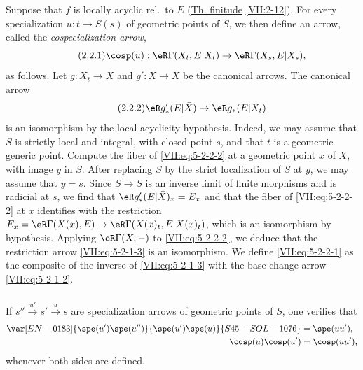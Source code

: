 Suppose that $f$ is locally acyclic rel.\ to $E$ (\hyperref[VII]{Th. finitude} \ref{VII:2-12}). For
every specialization $u:t\to S(s)$ of geometric points of $S$, we then define
an arrow, called the \emph{cospecialization arrow},
\begin{equation*}\tag{2.2.1}\label{VII:eq:5-2-2-1}
  \cosp(u):\eR\Gamma(X_t,E|X_t) \to \eR\Gamma(X_s,E|X_s) \text{,} 
\end{equation*}
as follows. Let $g:X_t\to X$ and $g':\bar X\to X$ be the canonical arrows.
The canonical arrow
\begin{equation*}\tag{2.2.2}\label{VII:eq:5-2-2-2}
  \eR g'_\ast(E|\bar X)\to \eR g_\ast(E|X_t) 
\end{equation*}
is an isomorphism by the local-acyclicity hypothesis. Indeed, we may assume
that $S$ is strictly local and integral, with closed point $s$, and that $t$
is a geometric generic point. Compute the fiber of
\eqref{VII:eq:5-2-2-2} at a geometric point $x$ of $X$, with image $y$ in
$S$. After replacing $S$ by the strict localization of $S$ at $y$, we may
assume that $y=s$. Since $\bar S\to S$ is an inverse limit of finite
morphisms and is radicial at $s$, we find that
$\eR g'_\ast(E|\bar X)_x = E_x$ and that the fiber of
\eqref{VII:eq:5-2-2-2} at $x$ identifies with the restriction
$E_x=\eR\Gamma(X(x),E)\to \eR\Gamma(X(x)_t,E|X(x)_t)$, which is an
isomorphism by hypothesis. Applying $\eR\Gamma(X,-)$ to
\eqref{VII:eq:5-2-2-2}, we deduce that the restriction arrow
\eqref{VII:eq:5-2-1-3} is an isomorphism. We define
\eqref{VII:eq:5-2-2-1} as the composite of the inverse of
\eqref{VII:eq:5-2-1-3} with the base-change arrow
\eqref{VII:eq:5-2-1-2}.






\subsubsection{}\label{VII:5-2-3}

If $s'' \xrightarrow{u'} s' \xrightarrow u s$ are specialization arrows of
geometric points of $S$, one verifies that
\begin{align*}
  \var[EN-0183]{\spe(u')\spe(u'')}{\spe(u')\spe(u)}{S45-SOL-1076} &= \spe(u u') \text{,} \\
  \cosp(u) \cosp(u') &= \cosp(u u') \text{,} 
\end{align*}
whenever both sides are defined.






